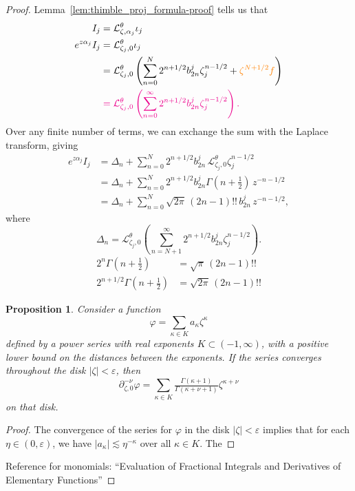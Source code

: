 \documentclass{article}
\newcommand{\laplace}{\mathcal{L}}
\theoremstyle{definition}
\theoremstyle{plain}
\newtheorem{prop}[definition]{Proposition}
\newenvironment{verify}{\color{ForestGreen}}{\color{black}}
\begin{document}
\begin{proof}
\color{RoyalBlue}
Lemma~\ref{lem:thimble_proj_formula-proof} tells us that
\begin{align*}
I_j & = \laplace_{\zeta, \alpha_j}^\theta \iota_j \\
e^{z\alpha_j} I_j & = \laplace_{\zeta_j, 0}^\theta \iota_j \\
& = \laplace_{\zeta_j, 0}^\theta \left( \sum_{n = 0}^N 2^{n+1/2} b_{2n}^j \zeta_j^{n - 1/2} + \textcolor{orange}{\zeta^{N+1/2} f}\right) \\
& \color{magenta} = \laplace_{\zeta_j, 0}^\theta \left( \sum_{n = 0}^\infty 2^{n+1/2} b_{2n}^j \zeta_j^{n - 1/2} \right).
\end{align*}
Over any finite number of terms, we can exchange the sum with the Laplace transform, giving
\begin{align*}
e^{z\alpha_j} I_j & = \Delta_n + \sum_{n = 0}^N 2^{n+1/2} b_{2n}^j\,\laplace_{\zeta_j, 0}^\theta \zeta_j^{n - 1/2} \\
& = \Delta_n + \sum_{n = 0}^N 2^{n+1/2} b_{2n}^j \Gamma(n + \tfrac{1}{2})\,z^{-n - 1/2} \\
& = \Delta_n + \sum_{n = 0}^N \sqrt{2\pi}\,(2n - 1)!!\,b_{2n}^j\,z^{-n - 1/2},
\end{align*}
where
\[ \Delta_n = \laplace_{\zeta_j, 0}^\theta \left( \sum_{n = N+1}^\infty 2^{n+1/2} b_{2n}^j \zeta_j^{n - 1/2} \right). \]
\begin{verify}
\begin{align*}
2^n \Gamma(n + \tfrac{1}{2}) & = \sqrt{\pi}\,(2n - 1)!! \\
2^{n + 1/2} \Gamma(n + \tfrac{1}{2}) & = \sqrt{2\pi}\,(2n - 1)!!
\end{align*}
\end{verify}

\begin{prop}
Consider a function
\[ \varphi = \sum_{\kappa \in K} a_\kappa \zeta^\kappa \]
defined by a power series with real exponents $K \subset (-1, \infty)$, with a positive lower bound on the distances between the exponents. If the series converges throughout the disk $|\zeta| < \varepsilon$, then
\[ \partial_{\zeta, 0}^{-\nu} \varphi = \sum_{\kappa \in K} \tfrac{\Gamma(\kappa+1)}{\Gamma(\kappa+\nu+1)} \zeta^{\kappa + \nu} \]
on that disk.
\end{prop}
\begin{proof}
The convergence of the series for $\varphi$ in the disk $|\zeta| < \varepsilon$ implies that for each $\eta \in (0, \varepsilon)$, we have $|a_\kappa| \lesssim \eta^{-\kappa}$ over all $\kappa \in K$. The
\end{proof}
\begin{verify}
Reference for monomials: ``Evaluation of Fractional Integrals and Derivatives of Elementary Functions''


\end{verify}
\end{proof}
\end{document}
